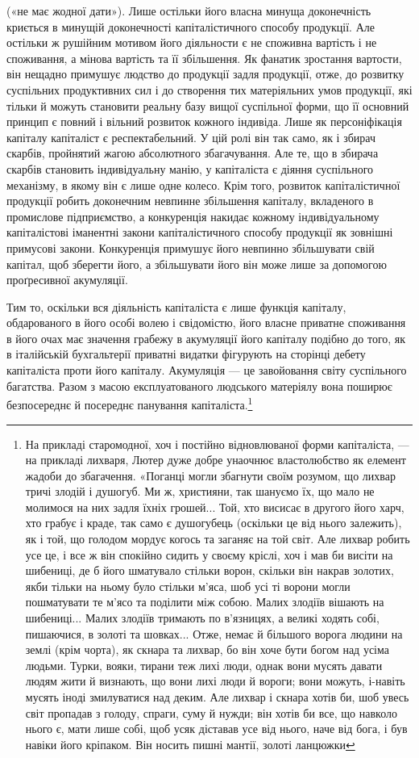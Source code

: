 («не має жодної дати»). Лише остільки його власна минуща
доконечність криється в минущій доконечності капіталістичного
способу продукції. Але остільки ж рушійним мотивом його
діяльности є не споживна вартість і не споживання, а мінова
вартість та її збільшення. Як фанатик зростання вартости, він
нещадно примушує людство до продукції задля продукції, отже,
до розвитку суспільних продуктивних сил і до створення тих
матеріяльних умов продукції, які тільки й можуть становити
реальну базу вищої суспільної форми, що її основний принцип
є повний і вільний розвиток кожного індивіда. Лише як персоніфікація
капіталу капіталіст є респектабельний. У цій ролі
він так само, як і збирач скарбів, пройнятий жагою абсолютного
збагачування. Але те, що в збирача скарбів становить індивідуальну
манію, у капіталіста є діяння суспільного механізму,
в якому він є лише одне колесо. Крім того, розвиток капіталістичної
продукції робить доконечним невпинне збільшення капіталу,
вкладеного в промислове підприємство, а конкуренція накидає
кожному індивідуальному капіталістові іманентні закони
капіталістичного способу продукції як зовнішні примусові закони.
Конкуренція примушує його невпинно збільшувати свій
капітал, щоб зберегти його, а збільшувати його він може лише
за допомогою проґресивної акумуляції.

Тим то, оскільки вся діяльність капіталіста є лише функція
капіталу, обдарованого в його особі волею і свідомістю, його
власне приватне споживання в його очах має значення грабежу
в акумуляції його капіталу подібно до того, як в італійській
бухгальтерії приватні видатки фігурують на сторінці дебету
капіталіста проти його капіталу. Акумуляція — це завойовання
світу суспільного багатства. Разом з масою експлуатованого людського
матеріялу вона поширює безпосереднє й посереднє панування
капіталіста.\footnote{
На прикладі старомодної, хоч і постійно відновлюваної форми
капіталіста, — на прикладі лихваря, Лютер дуже добре унаочнює властолюбство
як елемент жадоби до збагачення. «Поганці могли збагнути
своїм розумом, що лихвар тричі злодій і душогуб. Ми ж, християни, так
шануємо їх, що мало не молимося на них задля їхніх грошей... Той, хто
висисає в другого його харч, хто грабує і краде, так само є душогубець
(оскільки це від нього залежить), як і той, що голодом мордує когось
та заганяє на той світ. Але лихвар робить усе це, і все ж він спокійно
сидить у своєму кріслі, хоч і мав би висіти на шибениці, де б його шматувало
стільки ворон, скільки він накрав золотих, якби тільки на ньому
було стільки м’яса, шоб усі ті ворони могли пошматувати те м’ясо та
поділити між собою. Малих злодіїв вішають на шибениці... Малих злодіїв
тримають по в’язницях, а великі ходять собі, пишаючися, в золоті
та шовках... Отже, немає й більшого ворога людини на землі (крім чорта),
як скнара та лихвар, бо він хоче бути богом над усіма людьми. Турки,
вояки, тирани теж лихі люди, однак вони мусять давати людям жити й
визнають, що вони лихі люди й вороги; вони можуть, і-навіть мусять
іноді змилуватися над деким. Але лихвар і скнара хотів би, шоб увесь
світ пропадав з голоду, спраги, суму й нужди; він хотів би все, що навколо
нього є, мати лише собі, щоб усяк діставав усе від нього, наче від бога,
і був навіки його кріпаком. Він носить пишні мантії, золоті ланцюжки
}